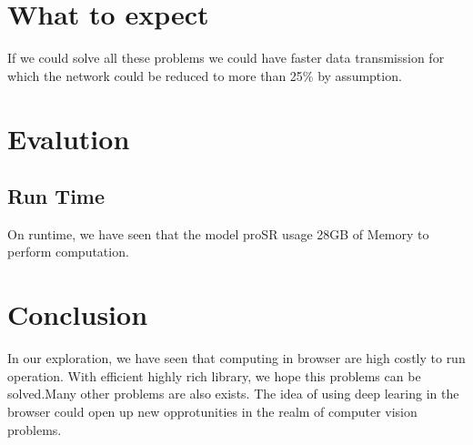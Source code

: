 \documentclass[a4paper,12pt]{article}
\begin{document}
\section{What to expect}
If we could solve all these problems we could have faster data transmission for which the network could be reduced to more than 25\% by assumption.

\section{Evalution}
\subsection{Run Time}
On runtime, we have seen that the model proSR usage 28GB of Memory to perform computation.

\section{Conclusion}
 In our exploration, we have seen that computing in browser are high costly to run operation. With efficient highly rich library, we hope this problems can be solved.Many other problems are also exists. The idea of using deep learing in the browser could open up new opprotunities in the realm of computer vision problems. 




\end{document}
